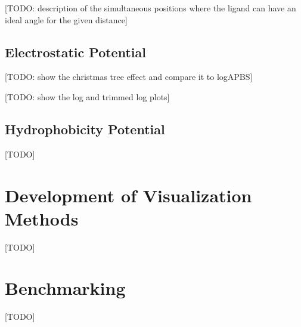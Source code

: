     [TODO: description of the simultaneous positions where the ligand can have an ideal angle for the given distance]

  \subsection{Electrostatic Potential}
    [TODO: show the christmas tree effect and compare it to logAPBS]

    [TODO: show the log and trimmed log plots]

  \subsection{Hydrophobicity Potential}
    [TODO]


\section{Development of Visualization Methods}
  [TODO]


\section{Benchmarking}
  [TODO]


